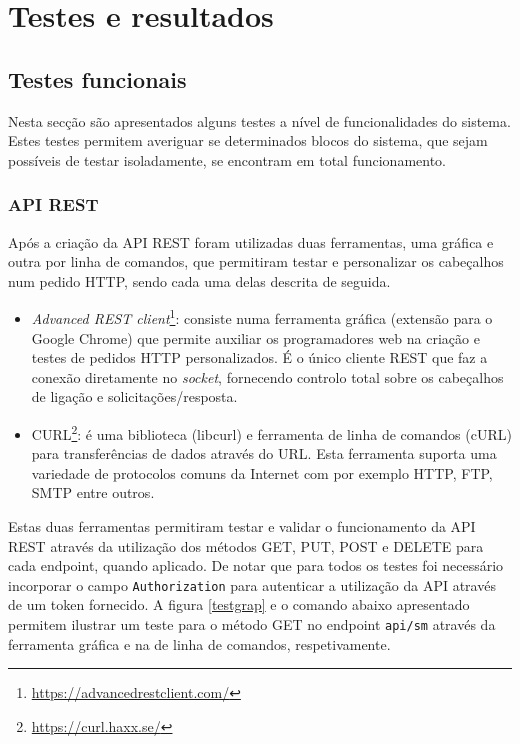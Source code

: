 \chapter{Testes e resultados}



\section{Testes funcionais}


Nesta secção são apresentados alguns testes a nível de funcionalidades do sistema. Estes testes permitem averiguar se determinados blocos do sistema, que sejam possíveis de testar isoladamente, se encontram em total funcionamento. 

\subsection{API REST}


Após a criação da API REST foram utilizadas duas ferramentas, uma gráfica e outra por linha de comandos, que permitiram testar e personalizar os cabeçalhos num pedido HTTP, sendo cada uma delas descrita de seguida.


\begin{itemize}
	\item \textit{Advanced REST client}\footnote{\url{https://advancedrestclient.com/}}: consiste numa ferramenta gráfica (extensão para o Google Chrome) que permite auxiliar os programadores web na criação e testes de pedidos \ac{HTTP} personalizados. É o único cliente \ac{REST} que faz a conexão diretamente no \textit{socket}, fornecendo controlo total sobre os cabeçalhos de ligação e solicitações/resposta.
	 
	\item CURL\footnote{\url{https://curl.haxx.se/}}: é uma biblioteca (libcurl) e ferramenta de linha de comandos (cURL) para transferências de dados através do \ac{URL}. Esta ferramenta suporta uma variedade de protocolos comuns da Internet com por exemplo \ac{HTTP}, \ac{FTP}, \ac{SMTP} entre outros. 
\end{itemize}


Estas duas ferramentas permitiram testar e validar o funcionamento da API REST através da utilização dos métodos GET, PUT, POST e DELETE para cada endpoint, quando aplicado. De notar que para todos os testes foi necessário incorporar o campo \texttt{Authorization} para autenticar a utilização da API através de um token fornecido. A figura \ref{testgrap} e o comando abaixo apresentado permitem ilustrar um teste para o método GET no endpoint \texttt{api/sm} através da ferramenta gráfica e na de linha de comandos, respetivamente. 






